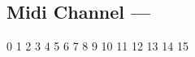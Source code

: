 \subsection[Midi Channel]{Midi Channel --- \UiKey{\SET}}









































0
1
2
3
4
5
6
7
8
9
10
11
12
13
14
15

